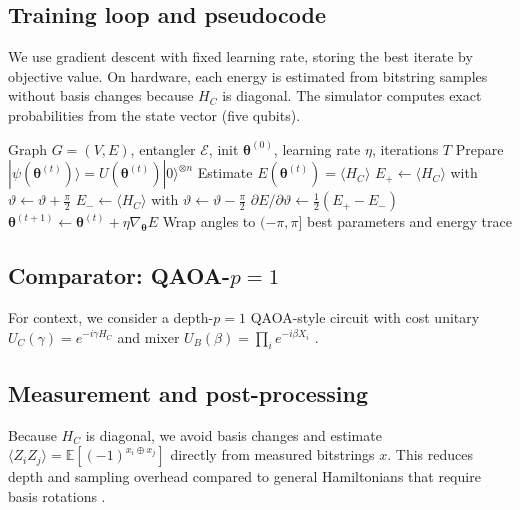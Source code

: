 \subsection{Training loop and pseudocode}
We use gradient descent with fixed learning rate, storing the best iterate by objective value. On hardware, each energy is estimated from bitstring samples without basis changes because $H_C$ is diagonal. The simulator computes exact probabilities from the state vector (five qubits).

\begin{algorithm}[htbp]
\caption{Parameter-shift training for a hardware-matched Max-Cut VQC}
\label{alg:train}
\begin{algorithmic}[1]
\Require Graph $G=(V,E)$, entangler $\mathcal{E}$, init $\boldsymbol{\theta}^{(0)}$, learning rate $\eta$, iterations $T$
  \State Prepare $|\psi(\boldsymbol{\theta}^{(t)})\rangle = U(\boldsymbol{\theta}^{(t)})|0\rangle^{\otimes n}$
  \State Estimate $E(\boldsymbol{\theta}^{(t)})=\langle H_C \rangle$
     \State $E_{+}\leftarrow \langle H_C \rangle$ with $\vartheta \gets \vartheta + \tfrac{\pi}{2}$
     \State $E_{-}\leftarrow \langle H_C \rangle$ with $\vartheta \gets \vartheta - \tfrac{\pi}{2}$
     \State $\partial E/\partial \vartheta \gets \tfrac{1}{2}(E_{+}-E_{-})$
  \EndFor
  \State $\boldsymbol{\theta}^{(t{+}1)} \gets \boldsymbol{\theta}^{(t)} + \eta \nabla_{\boldsymbol{\theta}} E$
  \State Wrap angles to $(-\pi,\pi]$
\EndFor
\State \Return best parameters and energy trace
\end{algorithmic}
\end{algorithm}

\subsection{Comparator: QAOA-$p{=}1$}
For context, we consider a depth-$p{=}1$ QAOA-style circuit with cost unitary $U_C(\gamma)=e^{-i\gamma H_C}$ and mixer $U_B(\beta)=\prod_i e^{-i\beta X_i}$ \cite{farhi2014qaoa,hadfield2019qaoaops}.

\subsection{Measurement and post-processing}
Because $H_C$ is diagonal, we avoid basis changes and estimate $\langle Z_i Z_j\rangle = \mathbb{E}[(-1)^{x_i \oplus x_j}]$ directly from measured bitstrings $x$. This reduces depth and sampling overhead compared to general Hamiltonians that require basis rotations \cite{huggins2021efficient,verteletskyi2020measurement}.

